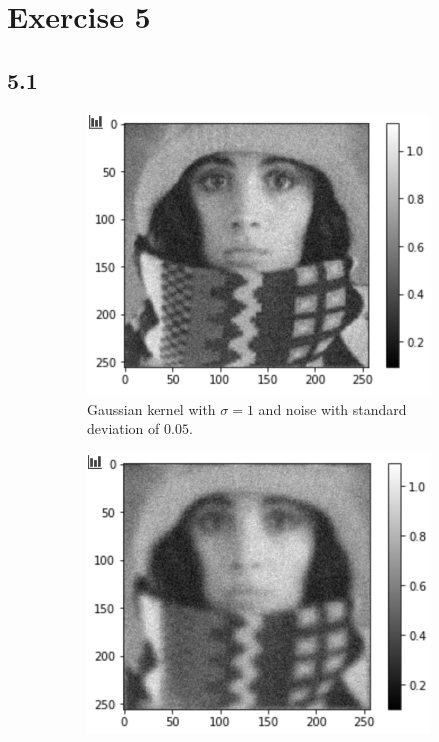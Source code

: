 \section{Exercise 5}
\subsection*{5.1}
\begin{figure}[H]
	\centering
	\begin{subfigure}[b]{0.45\linewidth}
		\centering
		\includegraphics[width=\linewidth]{Materials/E5/gaus1std005}
		\caption{Gaussian kernel with $\sigma = 1$ and noise with standard deviation of $0.05$.}
	\end{subfigure}
	\hfill
	\begin{subfigure}[b]{0.45\linewidth}
		\centering
		\includegraphics[width=\linewidth]{Materials/E5/gaus3std005}

\end{subfigure}
\end{figure}

